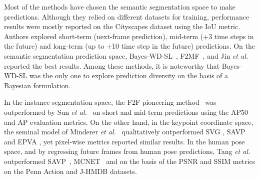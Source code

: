 Most of the methods have chosen the semantic segmentation space to make predictions. Although they relied on different datasets for training, performance results were mostly reported on the Cityscapes dataset using the \ac{IoU} metric. Authors explored short-term (next-frame prediction), mid-term (+3 time steps in the future) and long-term (up to +10 time step in the future) predictions. On the semantic segmentation prediction space, Bayes-WD-SL~\cite{Bhattacharyya2019}, F2MF~\cite{Saric2020}, and Jin \textit{et al.}~\cite{Jin2017} reported the best results. Among these methods, it is noteworthy that Bayes-WD-SL was the only one to explore prediction diversity on the basis of a Bayesian formulation.

In the instance segmentation space, the F2F pioneering method~\cite{Luc2018} was outperformed by Sun \textit{et al.}~\cite{Sun2019} on short and mid-term predictions using the AP50 and AP evaluation metrics. On the other hand, in the keypoint coordinate space, the seminal model of Minderer \textit{et al.}~\cite{Minderer2019} qualitatively outperformed \ac{SVG} \cite{Denton2018}, \ac{SAVP} \cite{Lee2018} and \ac{EPVA} \cite{Wichers2018}, yet pixel-wise metrics reported similar results. In the human pose space, and by regressing future frames from human pose predictions, Tang \textit{et al.}~\cite{Tang2019} outperformed \ac{SAVP}~\cite{Lee2018}, \ac{MCNET}~\cite{Villegas2017a} and \cite{Villegas2017} on the basis of the \ac{PSNR} and \ac{SSIM} metrics on the Penn Action and J-HMDB \cite{Jhuang2013} datasets.



